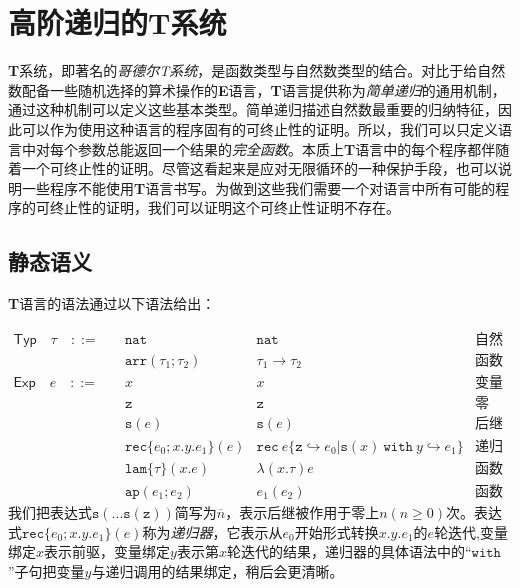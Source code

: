 \chapter{高阶递归的T系统}

\textbf{T}系统，即著名的\textit{哥德尔T系统}，是函数类型与自然数类型的结合。对比于给自然数配备一些随机选择的算术操作的\textbf{E}语言，\textbf{T}语言提供称为\textit{简单递归}的通用机制，通过这种机制可以定义这些基本类型。简单递归描述自然数最重要的归纳特征，因此可以作为使用这种语言的程序固有的可终止性的证明。所以，我们可以只定义语言中对每个参数总能返回一个结果的\textit{完全函数}。本质上\textbf{T}语言中的每个程序都伴随着一个可终止性的证明。尽管这看起来是应对无限循环的一种保护手段，也可以说明一些程序不能使用\textbf{T}语言书写。为做到这些我们需要一个对语言中所有可能的程序的可终止性的证明，我们可以证明这个可终止性证明不存在。

\section{静态语义}

\textbf{T}语言的语法通过以下语法给出：

$$
\begin{array}{llll}
\mathsf{Typ}\quad\tau\quad ::= \quad
    &\mathtt{nat}                   &\mathtt{nat}         &\text{自然数}\\
    &\mathtt{arr}(\tau_1;\tau_2)    &\tau_1\to\tau_2    &\text{函数}\\
\mathsf{Exp}\quad e \quad ::= \quad
    &x             &x             &\text{变量}\\
    &\mathtt{z}    &\mathtt{z}    &\text{零}\\
    &\mathtt{s}(e) &\mathtt{s}(e) &\text{后继}\\
    &\mathtt{rec}\{e_0;x.y.e_1\}(e)    &\mathtt{rec}\  e\{\mathtt{z} \hookrightarrow e_0 | \mathtt{s}(x)\  \mathtt{with}\  y \hookrightarrow e_1 \}    &\text{递归}\\
    &\mathtt{lam}\{\tau\}(x.e)    &\lambda(x.\tau)e    &\text{函数抽象}\\
    &\mathtt{ap}(e_1;e_2)    &e_1(e_2)    &\text{函数应用}
\end{array}
$$
我们把表达式$\mathtt{s}(...\mathtt{s}(\mathtt{z}))$简写为$\overline{n}$，表示后继被作用于零上$n(n\ge0)$次。表达式$\mathtt{rec}\{e_0;x.y.e_1\}(e)$称为\textit{递归器}，它表示从$e_0$开始形式转换$x.y.e_1$的$e$轮迭代,变量绑定$x$表示前驱，变量绑定$y$表示第$x$轮迭代的结果，递归器的具体语法中的“$\mathtt{with}$”子句把变量$y$与递归调用的结果绑定，稍后会更清晰。


